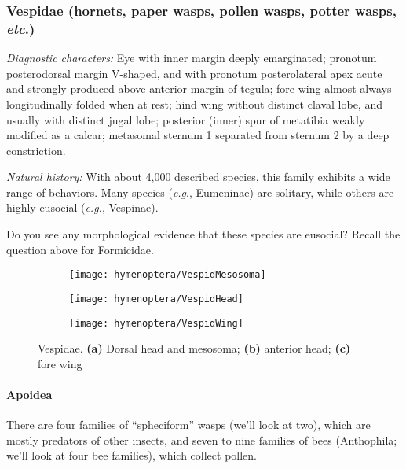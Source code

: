 \subsubsection{Vespidae (hornets, paper wasps, pollen wasps, potter wasps, \textit{etc}.)}
\noindent{}\textit{Diagnostic characters:} Eye with inner margin deeply emarginated; pronotum posterodorsal margin V-shaped, and with pronotum posterolateral apex acute and strongly produced above anterior margin of tegula; fore wing almost always longitudinally folded when at rest; hind wing without distinct claval lobe, and usually with distinct jugal lobe; posterior (inner) spur of metatibia weakly modified as a calcar; metasomal sternum 1 separated from sternum 2 by a deep constriction.\vspace{3mm}

\noindent{}\textit{Natural history:} With about 4,000 described species, this family exhibits a wide range of behaviors. Many species (\textit{e.g}., Eumeninae) are solitary, while others are highly eusocial (\textit{e.g.}, Vespinae).

\begin{theo}
{}Do you see any morphological evidence that these species are eusocial? Recall the question above for Formicidae.
\end{theo}

\begin{figure}[ht!]
    \centering
    \begin{subfigure}[ht!]{0.22\textwidth}
        \texttt{[image: hymenoptera/VespidMesosoma]}
        \caption{}
        \label{fig:vespid1}
    \end{subfigure}
    \hfill
    \begin{subfigure}[ht!]{0.2\textwidth}
        \texttt{[image: hymenoptera/VespidHead]}
        \caption{}
        \label{fig:vespid2}
    \end{subfigure}
    \hfill
    \begin{subfigure}[ht!]{0.45\textwidth}
        \texttt{[image: hymenoptera/VespidWing]}
        \caption{}
        \label{fig:vespid3}
    \end{subfigure}
    \caption{Vespidae. \textbf{(a)} Dorsal head and mesosoma; \textbf{(b)} anterior head; \textbf{(c)} fore wing \citep[][pp. 214--215]{goulet1993hymenoptera}}\label{fig:vespids}
\end{figure}
\FloatBarrier

\paragraph*{Apoidea} There are four families of ``spheciform'' wasps (we'll look at two), which are mostly predators of other insects, and seven to nine families of bees (Anthophila; we'll look at four bee families), which collect pollen.\vspace{3mm}

